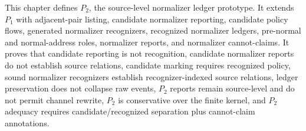 \begin{remark}[Summary]
\label{rem:source-normalizer-summary}
This chapter defines $P_2$, the source-level normalizer ledger prototype. It extends $P_1$ with adjacent-pair listing, candidate normalizer reporting, candidate policy flows, generated normalizer recognizers, recognized normalizer ledgers, pre-normal and normal-address roles, normalizer reports, and normalizer cannot-claims. It proves that candidate reporting is not recognition, candidate normalizer reports do not establish source relations, candidate marking requires recognized policy, sound normalizer recognizers establish recognizer-indexed source relations, ledger preservation does not collapse raw events, $P_2$ reports remain source-level and do not permit channel rewrite, $P_2$ is conservative over the finite kernel, and $P_2$ adequacy requires candidate/recognized separation plus cannot-claim annotations.
\end{remark}
